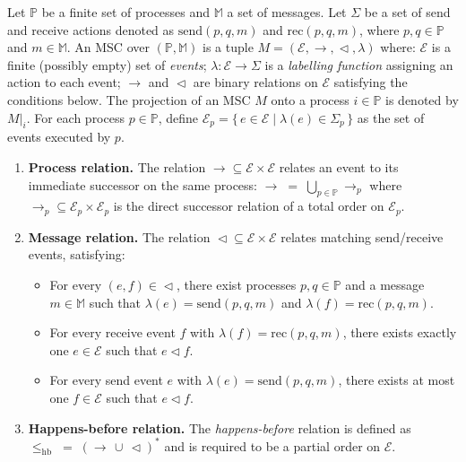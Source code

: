 \begin{definition}
Let $\mathbb{P}$ be a finite set of processes and $\mathbb{M}$ a set of messages.
Let $\Sigma$ be a set of send and receive actions denoted as $\mathrm{send}(p,q,m)$
and $\mathrm{rec}(p,q,m)$, where $p,q \in \mathbb{P}$ and $m\in \mathbb{M}$.
An MSC over $(\mathbb{P}, \mathbb{M})$ is a tuple
$M = (\mathcal{E}, \rightarrow, \vartriangleleft, \lambda)$ where:
$\mathcal{E}$ is a finite (possibly empty) set of \emph{events};
$\lambda : \mathcal{E} \to \Sigma$ is a \emph{labelling function} assigning an action to each event;
$\rightarrow$ and $\vartriangleleft$ are binary relations on $\mathcal{E}$ satisfying the conditions below.
The projection of an MSC $M$ onto a process $i \in \mathbb{P}$ is denoted by $M|_i$.
For each process $p \in \mathbb{P}$, define
$\mathcal{E}_p = \{\, e \in \mathcal{E} \mid \lambda(e) \in \Sigma_p \,\}$
as the set of events executed by $p$.
\begin{enumerate}
    \item \textbf{Process relation.}  
    The relation $\rightarrow \subseteq \mathcal{E} \times \mathcal{E}$ relates an event to its immediate successor on the same process:
    $\rightarrow \;=\; \bigcup_{p \in \mathbb{P}} \rightarrow_p$
    where $\rightarrow_p \subseteq \mathcal{E}_p \times \mathcal{E}_p$ is the direct successor relation of a total order on $\mathcal{E}_p$.

    \item \textbf{Message relation.}  
    The relation $\vartriangleleft \subseteq \mathcal{E} \times \mathcal{E}$ relates matching send/receive events, satisfying:
    \begin{itemize}
        \item For every $(e,f) \in \vartriangleleft$, there exist processes $p,q \in \mathbb{P}$ and a message $m \in \mathbb{M}$ such that  
        $\lambda(e) = \mathrm{send}(p,q,m)$ and $\lambda(f) = \mathrm{rec}(p,q,m)$.
        \item For every receive event $f$ with $\lambda(f) = \mathrm{rec}(p,q,m)$, there exists exactly one $e \in \mathcal{E}$ such that $e \vartriangleleft f$.
        \item For every send event $e$ with $\lambda(e) = \mathrm{send}(p,q,m)$, there exists at most one $f \in \mathcal{E}$ such that $e \vartriangleleft f$.
    \end{itemize}

    \item \textbf{Happens-before relation.}  
    The \emph{happens-before} relation is defined as
    $\le_{\mathrm{hb}} \;=\; (\rightarrow \,\cup\, \vartriangleleft)^{*}$
    and is required to be a partial order on $\mathcal{E}$.
\end{enumerate}
\end{definition}

